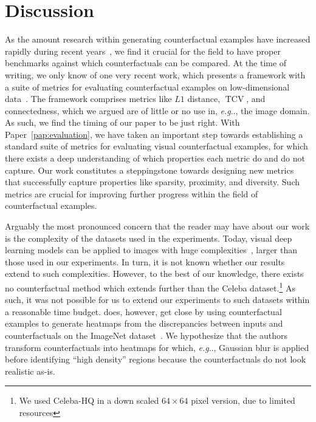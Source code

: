 \documentclass[11pt,a4paper,twoside,openright,final]{memoir}
\makeatletter
\DeclareRobustCommand\onedot{\futurelet\@let@token\@onedot}
\def\@onedot{\ifx\@let@token.\else.\null\fi\xspace}
\def\eg{\emph{e.g}\onedot} \def\Eg{\emph{E.g}\onedot}
\newcommand*{\paperref}[1]{Paper~\hyperref[#1]{\ref{#1}}}
\makeatother
\begin{document}
\section{Discussion}\label{sec:eval-discussion}
As the amount research within generating counterfactual examples have increased rapidly during recent years~\cite{Stepin2021}, we find it crucial for the field to have proper benchmarks against which counterfactuals can be compared.
At the time of writing, we only know of one very recent work, which presents a framework with a suite of metrics for evaluating counterfactual examples on low-dimensional data~\cite{clara}. 
The framework comprises metrics like $L1$ distance, $\operatorname{TCV}$, and connectedness, which we argued are of little or no use in, \eg, the image domain.
As such, we find the timing of our paper to be just right. 
With \paperref{pap:evaluation}, we have taken an important step towards establishing a standard suite of metrics for evaluating visual counterfactual examples, for which there exists a deep understanding of which properties each metric do and do not capture.
Our work constitutes a steppingstone towards designing new metrics that successfully capture properties like sparsity, proximity, and diversity.
Such metrics are crucial for improving further progress within the field of counterfactual examples.

Arguably the most pronounced concern that the reader may have about our work is the complexity of the datasets used in the experiments. 
Today, visual deep learning models can be applied to images with huge complexities~\cite{biggan, vit}, larger than those used in our experiments.
In turn, it is not known whether our results extend to such complexities.
However, to the best of our knowledge, there exists no counterfactual method which extends further than the Celeba dataset.\footnote{We used Celeba-HQ in a down scaled $64\times 64$ pixel version, due to limited resources}
As such, it was not possible for us to extend our experiments to such datasets within a reasonable time budget. 
\citet{Elliott_2021_CVPR} does, however, get close by using counterfactual examples to generate heatmaps from the discrepancies between inputs and counterfactuals on the ImageNet dataset~\cite{imagenet}. 
We hypothesize that the authors transform counterfactuals into heatmaps for which, \eg, Gaussian blur is applied before identifying ``high density'' regions because the counterfactuals do not look realistic as-is.
\end{document}
